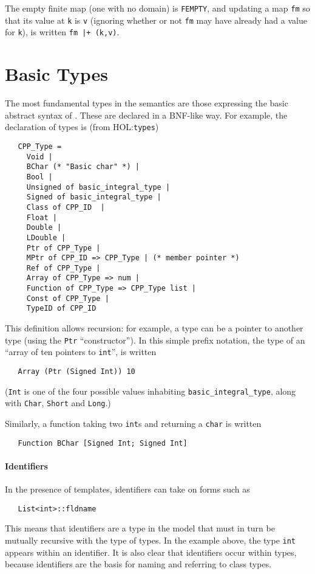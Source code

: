 \documentclass[11pt]{article}
\newcommand{\HOLfile}[1]{HOL:\texttt{#1}}
\begin{document}
The empty finite map (one with no domain) is \texttt{FEMPTY}, and
updating a map \texttt{fm} so that its value at \texttt{k} is
\texttt{v} (ignoring whether or not \texttt{fm} may have already had a
value for \texttt{k}), is written \texttt{fm |+ (k,v)}.

\section{Basic Types}
\label{sec:basic-types}

The most fundamental types in the semantics are those expressing the
basic abstract syntax of \cpp{}.  These are declared in a BNF-like
way.  For example, the declaration of \cpp{} types is (from
\HOLfile{types})
\begin{verbatim}
   CPP_Type =
     Void |
     BChar (* "Basic char" *) |
     Bool |
     Unsigned of basic_integral_type |
     Signed of basic_integral_type |
     Class of CPP_ID  |
     Float |
     Double |
     LDouble |
     Ptr of CPP_Type |
     MPtr of CPP_ID => CPP_Type | (* member pointer *)
     Ref of CPP_Type |
     Array of CPP_Type => num |
     Function of CPP_Type => CPP_Type list |
     Const of CPP_Type |
     TypeID of CPP_ID
\end{verbatim}
This definition allows recursion: for example, a \cpp{} type can be a
pointer to another \cpp{} type (using the \texttt{Ptr}
``constructor'').  In this simple prefix notation, the type of an
``array of ten pointers to \texttt{int}'', is written
\begin{verbatim}
   Array (Ptr (Signed Int)) 10
\end{verbatim}
(\texttt{Int} is one of the four possible values inhabiting
\texttt{basic_integral_type}, along with \texttt{Char}, \texttt{Short}
and \texttt{Long}.)

Similarly, a function taking two \texttt{int}s and returning a
\texttt{char} is written
\begin{verbatim}
   Function BChar [Signed Int; Signed Int]
\end{verbatim}

\paragraph{Identifiers}
In the presence of templates, identifiers can take on forms such as
\begin{verbatim}
   List<int>::fldname
\end{verbatim}

This means that identifiers are a type in the model that must in turn
be mutually recursive with the type of types.  In the example above,
the type \texttt{int} appears within an identifier.  It is also clear
that identifiers occur within types, because identifiers are the basis
for naming and referring to class types.
\end{document}
